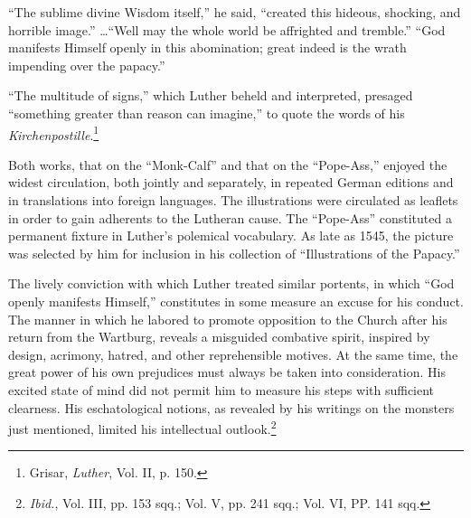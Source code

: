 “The sublime divine Wisdom itself,” he said, “created this hideous, shocking,
and horrible image.” \dots “Well may the whole world be affrighted and
tremble.” “God manifests Himself openly in this abomination; great indeed
is the wrath impending over the papacy.”

“The multitude of signs,” which Luther beheld and interpreted, presaged
“something greater than reason can imagine,” to quote the words of his
\textit{Kirchenpostille}.\footnote{Grisar, \textit{Luther}, Vol. II, p. 150.}

Both works, that on the “Monk-Calf” and that on the “Pope-Ass,”
enjoyed the widest circulation, both jointly and separately, in repeated
German editions and in translations into foreign languages.
The illustrations were circulated as leaflets in order to gain adherents
to the Lutheran cause. The “Pope-Ass” constituted a permanent
fixture in Luther’s polemical vocabulary. As late as 1545, the picture
was selected by him for inclusion in his collection of “Illustrations
of the Papacy.”

The lively conviction with which Luther treated similar portents, in
which “God openly manifests Himself,” constitutes in some measure
an excuse for his conduct. The manner in which he labored to
promote opposition to the Church after his return from the Wartburg,
reveals a misguided combative spirit, inspired by design, acrimony,
hatred, and other reprehensible motives. At the same time, the great
power of his own prejudices must always be taken into consideration.
His excited state of mind did not permit him to measure his steps
with sufficient clearness. His eschatological notions, as revealed by
his writings on the monsters just mentioned, limited his intellectual
outlook.\footnote
{\textit{Ibid.}, Vol. III, pp. 153 sqq.; Vol. V, pp. 241 sqq.; Vol. VI, PP. 141 sqq.}

